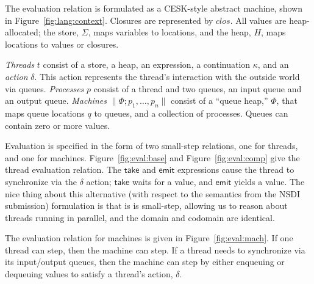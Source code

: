 \documentclass[twocolumn]{article}
\newcommand{\kw}[1]{\textsf{#1}}
\newcommand{\mach}[2]{\parallel\!#1; #2\!\parallel}
\begin{document}
The evaluation relation is formulated as a CESK-style abstract machine, shown in
Figure~\ref{fig:lang:context}. Closures are represented by $clos$. All values
are heap-allocated; the store, $\Sigma$, maps variables to locations, and the
heap, $H$, maps locations to values or closures.

\emph{Threads} $t$ consist of a store, a heap, an expression, a continuation
$\kappa$, and an \emph{action} $\delta$. This action represents the thread's
interaction with the outside world via queues. \emph{Processes} $p$ consist of a
thread and two queues, an input queue and an output queue. \emph{Machines}
$\mach{\Phi}{p_1,\ldots,p_n}$ consist of a ``queue heap,'' $\Phi$, that maps
queue locations $q$ to queues, and a collection of processes. Queues can contain
zero or more values.

Evaluation is specified in the form of two small-step relations, one for
threads, and one for machines. Figure~\ref{fig:eval:base} and
Figure~\ref{fig:eval:comp} give the thread evaluation relation. The $\kw{take}$
and $\kw{emit}$ expressions cause the thread to synchronize via the $\delta$
action; $\kw{take}$ waits for a value, and $\kw{emit}$ yields a value. The nice
thing about this alternative (with respect to the semantics from the NSDI
submission) formulation is that is is small-step, allowing us to reason about
threads running in parallel, and the domain and codomain are identical.

The evaluation relation for machines is given in Figure~\ref{fig:eval:mach}. If
one thread can step, then the machine can step. If a thread needs to synchronize
via its input/output queues, then the machine can step by either enqueuing or
dequeuing values to satisfy a thread's action, $\delta$.
\end{document}
